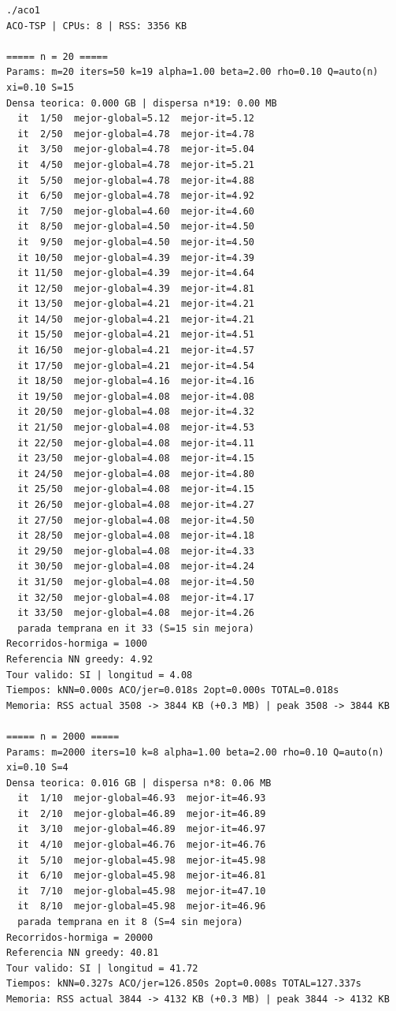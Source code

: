 \documentclass[11pt,a4paper]{article}
\begin{document}
\begin{lstlisting}
./aco1             
ACO-TSP | CPUs: 8 | RSS: 3356 KB

===== n = 20 =====
Params: m=20 iters=50 k=19 alpha=1.00 beta=2.00 rho=0.10 Q=auto(n) xi=0.10 S=15
Densa teorica: 0.000 GB | dispersa n*19: 0.00 MB
  it  1/50  mejor-global=5.12  mejor-it=5.12
  it  2/50  mejor-global=4.78  mejor-it=4.78
  it  3/50  mejor-global=4.78  mejor-it=5.04
  it  4/50  mejor-global=4.78  mejor-it=5.21
  it  5/50  mejor-global=4.78  mejor-it=4.88
  it  6/50  mejor-global=4.78  mejor-it=4.92
  it  7/50  mejor-global=4.60  mejor-it=4.60
  it  8/50  mejor-global=4.50  mejor-it=4.50
  it  9/50  mejor-global=4.50  mejor-it=4.50
  it 10/50  mejor-global=4.39  mejor-it=4.39
  it 11/50  mejor-global=4.39  mejor-it=4.64
  it 12/50  mejor-global=4.39  mejor-it=4.81
  it 13/50  mejor-global=4.21  mejor-it=4.21
  it 14/50  mejor-global=4.21  mejor-it=4.21
  it 15/50  mejor-global=4.21  mejor-it=4.51
  it 16/50  mejor-global=4.21  mejor-it=4.57
  it 17/50  mejor-global=4.21  mejor-it=4.54
  it 18/50  mejor-global=4.16  mejor-it=4.16
  it 19/50  mejor-global=4.08  mejor-it=4.08
  it 20/50  mejor-global=4.08  mejor-it=4.32
  it 21/50  mejor-global=4.08  mejor-it=4.53
  it 22/50  mejor-global=4.08  mejor-it=4.11
  it 23/50  mejor-global=4.08  mejor-it=4.15
  it 24/50  mejor-global=4.08  mejor-it=4.80
  it 25/50  mejor-global=4.08  mejor-it=4.15
  it 26/50  mejor-global=4.08  mejor-it=4.27
  it 27/50  mejor-global=4.08  mejor-it=4.50
  it 28/50  mejor-global=4.08  mejor-it=4.18
  it 29/50  mejor-global=4.08  mejor-it=4.33
  it 30/50  mejor-global=4.08  mejor-it=4.24
  it 31/50  mejor-global=4.08  mejor-it=4.50
  it 32/50  mejor-global=4.08  mejor-it=4.17
  it 33/50  mejor-global=4.08  mejor-it=4.26
  parada temprana en it 33 (S=15 sin mejora)
Recorridos-hormiga = 1000
Referencia NN greedy: 4.92
Tour valido: SI | longitud = 4.08
Tiempos: kNN=0.000s ACO/jer=0.018s 2opt=0.000s TOTAL=0.018s
Memoria: RSS actual 3508 -> 3844 KB (+0.3 MB) | peak 3508 -> 3844 KB

===== n = 2000 =====
Params: m=2000 iters=10 k=8 alpha=1.00 beta=2.00 rho=0.10 Q=auto(n) xi=0.10 S=4
Densa teorica: 0.016 GB | dispersa n*8: 0.06 MB
  it  1/10  mejor-global=46.93  mejor-it=46.93
  it  2/10  mejor-global=46.89  mejor-it=46.89
  it  3/10  mejor-global=46.89  mejor-it=46.97
  it  4/10  mejor-global=46.76  mejor-it=46.76
  it  5/10  mejor-global=45.98  mejor-it=45.98
  it  6/10  mejor-global=45.98  mejor-it=46.81
  it  7/10  mejor-global=45.98  mejor-it=47.10
  it  8/10  mejor-global=45.98  mejor-it=46.96
  parada temprana en it 8 (S=4 sin mejora)
Recorridos-hormiga = 20000
Referencia NN greedy: 40.81
Tour valido: SI | longitud = 41.72
Tiempos: kNN=0.327s ACO/jer=126.850s 2opt=0.008s TOTAL=127.337s
Memoria: RSS actual 3844 -> 4132 KB (+0.3 MB) | peak 3844 -> 4132 KB


\end{lstlisting}
\end{document}
